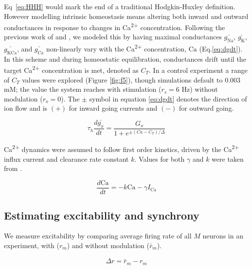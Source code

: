 \documentclass{article}
\begin{document}

Eq~\ref{eq:HHH} would mark the end of a traditional Hodgkin-Huxley definition. However modelling intrinsic homeostasis means altering both inward and outward conductances in response to changes in Ca\textsuperscript{2+} concentration. Following the previous work of \cite{LeMasson1993} and \cite{Siegel1994}, we modeled this by having maximal conductances $\bar{g_\text{Na}}$, $\bar{g_\text{K}}$, $\bar{g_\text{KCa}}$, and $\bar{g_\text{Ca}}$ non-linearly vary with the Ca\textsuperscript{2+} concentration, $\text{Ca}$ (Eq.\ref{eq:dgdt}). In this scheme and during homeostatic equilibration, conductances drift until the target Ca\textsuperscript{2+} concentration is met, denoted as $C_T$. In a control experiment a range of $C_T$ values were explored (Figure \ref{fig:f5}), though simulations default to 0.003 mM; the value the system reaches with stimulation ($r_s = 6$ Hz) without modulation ($r_o = 0$). The $\pm$ symbol in equation \ref{eq:dgdt} denotes the direction of ion flow and is $(+)$ for inward going currents and $(-)$ for outward going.

\begin{equation}
\label{eq:dgdt}
\tau_h \frac{d \bar{g_x}}{dt} = \frac{G_x}{1 + e^{\pm (Ca - C_T)/\Delta}}
\end{equation}

Ca\textsuperscript{2+} dynamics were assumed to follow first order kinetics, driven by the Ca\textsuperscript{2+} influx current and clearance rate constant $k$. Values for both $\gamma$ and $k$ were taken from \cite{Liu1998}.

\begin{equation}
\label{eq:passive}
\frac{d\text{Ca}}{dt} = -k \text{Ca} - \gamma I_\text{Ca}
\end{equation}

\subsection*{Estimating excitability and synchrony}
We measure excitability by comparing average firing rate of all $M$ neurons in an experiment, with ($r_m$) and without modulation ($\bar{r}_m$). 

\begin{align}
    \label{eq:excite}
    \Delta r = \bar{r}_m - r_m
\end{align}
\end{document}
